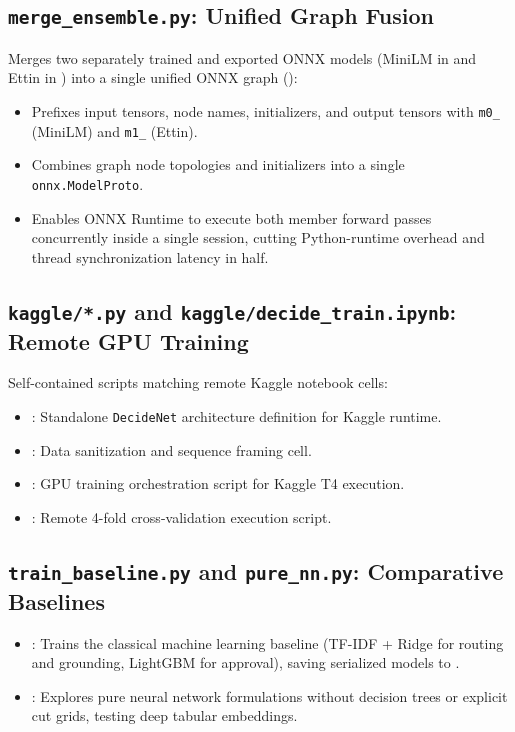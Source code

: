 \documentclass[11pt,a4paper]{article}
\begin{document}
\subsection{\texttt{merge\_ensemble.py}: Unified Graph Fusion}
Merges two separately trained and exported ONNX models (MiniLM in  and Ettin in ) into a single unified ONNX graph ():
\begin{itemize}
  \item Prefixes input tensors, node names, initializers, and output tensors with \texttt{m0\_} (MiniLM) and \texttt{m1\_} (Ettin).
  \item Combines graph node topologies and initializers into a single \texttt{onnx.ModelProto}.
  \item Enables ONNX Runtime to execute both member forward passes concurrently inside a single session, cutting Python-runtime overhead and thread synchronization latency in half.
\end{itemize}

\subsection{\texttt{kaggle/*.py} and \texttt{kaggle/decide\_train.ipynb}: Remote GPU Training}
Self-contained scripts matching remote Kaggle notebook cells:
\begin{itemize}
  \item {}: Standalone \texttt{DecideNet} architecture definition for Kaggle runtime.
  \item {}: Data sanitization and sequence framing cell.
  \item {}: GPU training orchestration script for Kaggle T4 execution.
  \item {}: Remote 4-fold cross-validation execution script.
\end{itemize}

\subsection{\texttt{train\_baseline.py} and \texttt{pure\_nn.py}: Comparative Baselines}
\begin{itemize}
  \item {}: Trains the classical machine learning baseline (TF-IDF + Ridge for routing and grounding, LightGBM for approval), saving serialized models to .
  \item {}: Explores pure neural network formulations without decision trees or explicit cut grids, testing deep tabular embeddings.
\end{itemize}
\end{document}
